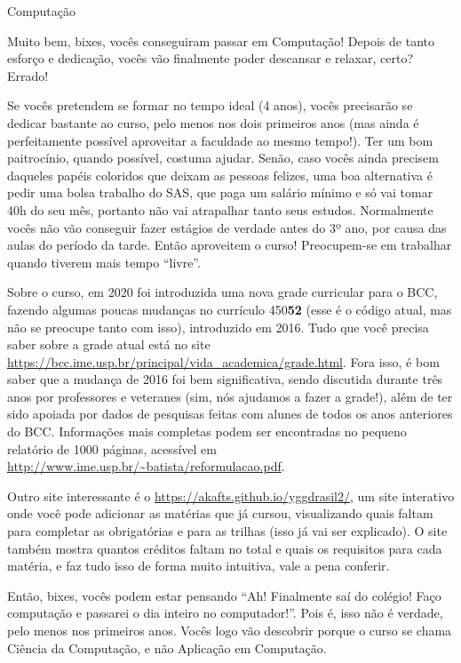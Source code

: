 \begin{subsecao}{Computação}

Muito bem, bixes, vocês conseguiram passar em Computação! Depois de tanto
esforço e dedicação, vocês vão finalmente poder descansar e relaxar, certo?
Errado!

Se vocês pretendem se formar no tempo ideal (4 anos), vocês precisarão se
dedicar bastante ao curso, pelo menos nos dois primeiros anos (mas ainda é
perfeitamente possível aproveitar a faculdade ao mesmo tempo!). Ter um bom
paitrocínio, quando possível, costuma ajudar. Senão, caso vocês ainda precisem
daqueles papéis coloridos que deixam as pessoas felizes, uma boa alternativa é
pedir uma bolsa trabalho do SAS, que paga um salário mínimo e só vai tomar
40h do seu mês, portanto não vai atrapalhar tanto seus estudos. Normalmente
vocês não vão conseguir fazer estágios de verdade antes do 3º ano, por causa
das aulas do período da tarde. Então aproveitem o curso! Preocupem-se em
trabalhar quando tiverem mais tempo ``livre''.

Sobre o curso, em 2020 foi introduzida uma nova grade curricular para o BCC,
fazendo algumas poucas mudanças no currículo 450\textbf{52} (esse é o código
atual, mas não se preocupe tanto com isso), introduzido em 2016. Tudo que você
precisa saber sobre a grade atual está no site
\url{https://bcc.ime.usp.br/principal/vida\_academica/grade.html}.
Fora isso, é bom saber que a mudança de 2016 foi bem significativa, sendo
discutida durante três anos por professores e veteranes (sim, nós ajudamos a
fazer a grade!), além de ter sido apoiada por dados de pesquisas feitas com
alunes de todos os anos anteriores do BCC. Informações mais completas podem
ser encontradas no pequeno relatório de 1000 páginas, acessível em
\url{http://www.ime.usp.br/~batista/reformulacao.pdf}.

Outro site interessante é o \url{https://akafts.github.io/yggdrasil2/}, um
site interativo onde você pode adicionar as matérias que já cursou,
visualizando quais faltam para completar as obrigatórias e para as trilhas
(isso já vai ser explicado). O site também mostra quantos créditos faltam no
total e quais os requisitos para cada matéria, e faz tudo isso de forma muito
intuitiva, vale a pena conferir.

Então, bixes, vocês podem estar pensando ``Ah! Finalmente saí do colégio! Faço
computação e passarei o dia inteiro no computador!''. Pois é, isso não é
verdade, pelo menos nos primeiros anos. Vocês logo vão descobrir porque o
curso se chama Ciência da Computação, e não Aplicação em Computação.


\end{subsecao}
